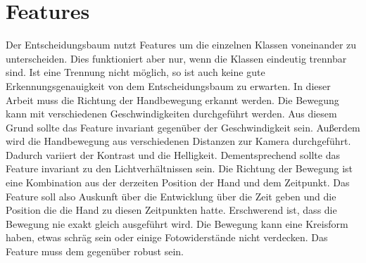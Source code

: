 \section{Features}
Der Entscheidungsbaum nutzt Features um die einzelnen Klassen voneinander zu unterscheiden. Dies funktioniert aber nur, wenn die Klassen eindeutig trennbar sind. Ist eine Trennung nicht möglich, so ist
auch keine gute Erkennungsgenauigkeit von dem Entscheidungsbaum zu erwarten.
\newline
\newline
In dieser Arbeit muss die Richtung der Handbewegung erkannt werden. Die Bewegung kann mit verschiedenen Geschwindigkeiten durchgeführt werden. Aus diesem Grund sollte das Feature invariant
gegenüber der Geschwindigkeit sein. Außerdem wird die Handbewegung aus verschiedenen Distanzen zur Kamera durchgeführt. Dadurch variiert der Kontrast und die Helligkeit.
Dementsprechend sollte das Feature invariant zu den Lichtverhältnissen sein. Die Richtung der Bewegung ist eine Kombination aus der derzeiten Position der Hand und dem Zeitpunkt. Das Feature soll
also Auskunft über die Entwicklung über die Zeit geben und die Position die die Hand zu diesen Zeitpunkten hatte.
\newline
\newline
Erschwerend ist, dass die Bewegung nie exakt gleich ausgeführt wird. Die Bewegung kann eine Kreisform haben, etwas schräg sein oder einige Fotowiderstände nicht verdecken. Das Feature muss dem gegenüber
robust sein.

